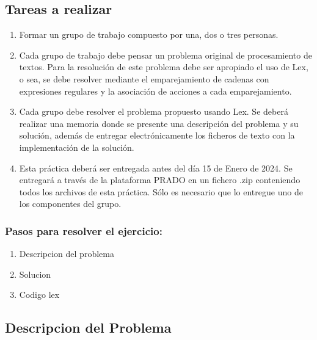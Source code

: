 \documentclass{article}
\begin{document}
        \subsection{Tareas a realizar}
        \begin{enumerate}
        \item Formar un grupo de trabajo compuesto por una, dos o tres personas.
        \item Cada grupo de trabajo debe pensar un problema original de procesamiento de textos. Para la resolución de este problema debe ser apropiado el uso de Lex, o sea, se debe resolver mediante el emparejamiento de cadenas con expresiones regulares y la asociación de acciones a cada emparejamiento.
        \item Cada grupo debe resolver el problema propuesto usando Lex. Se deberá realizar una memoria donde se presente una descripción del problema y su solución, además de entregar electrónicamente los ficheros de texto con la implementación de la solución.
        \item Esta práctica deberá ser entregada antes del día 15 de Enero de 2024. Se entregará a través de la plataforma PRADO en un fichero .zip conteniendo todos los archivos de esta práctica. Sólo es necesario que lo entregue uno de los componentes del grupo.
        \end{enumerate}

        \vspace{\baselineskip} %


        \begin{flushleft}
            
            \subsubsection*{Pasos para resolver el ejercicio:}
                        
            \begin{enumerate}
                \item Descripcion del problema 
                \item Solucion 
                \item Codigo lex
            \end{enumerate}
        \end{flushleft}

        \newpage

        \subsection{Descripcion del Problema}
        
\end{document}
